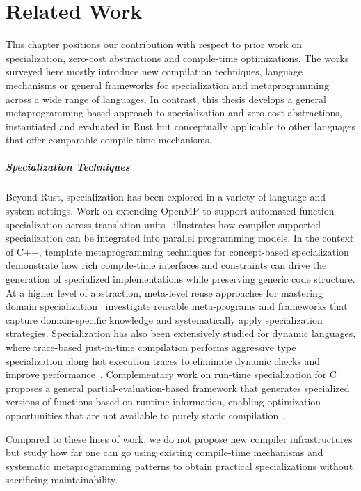 \chapter{Related Work}\label{chap:related_work}

This chapter positions our contribution with respect to prior work on specialization, zero-cost abstractions and compile-time optimizations.
The works surveyed here mostly introduce new compilation techniques, language mechanisms or general frameworks for specialization and metaprogramming across a wide range of languages.
In contrast, this thesis develops a general metaprogramming-based approach to specialization and zero-cost abstractions, instantiated and evaluated in Rust but conceptually applicable to other languages that offer comparable compile-time mechanisms.

\paragraph{Specialization Techniques}
Beyond Rust, specialization has been explored in a variety of language and system settings.
Work on extending OpenMP to support automated function specialization across translation units~\cite{OpenMPSpecialization22} illustrates how compiler-supported specialization can be integrated into parallel programming models.
In the context of C++, template metaprogramming techniques for concept-based specialization~\cite{TemplateMetaprogrammingTechniques13} demonstrate how rich compile-time interfaces and constraints can drive the generation of specialized implementations while preserving generic code structure.
At a higher level of abstraction, meta-level reuse approaches for mastering domain specialization~\cite{MetaLevelReuse16} investigate reusable meta-programs and frameworks that capture domain-specific knowledge and systematically apply specialization strategies.
Specialization has also been extensively studied for dynamic languages, where trace-based just-in-time compilation performs aggressive type specialization along hot execution traces to eliminate dynamic checks and improve performance~\cite{Gal2009TracebasedJT}.
Complementary work on run-time specialization for C proposes a general partial-evaluation-based framework that generates specialized versions of functions based on runtime information, enabling optimization opportunities that are not available to purely static compilation~\cite{Consel1996AGA}.

Compared to these lines of work, we do not propose new compiler infrastructures but study how far one can go using existing compile-time mechanisms and systematic metaprogramming patterns to obtain practical specializations without sacrificing maintainability.

